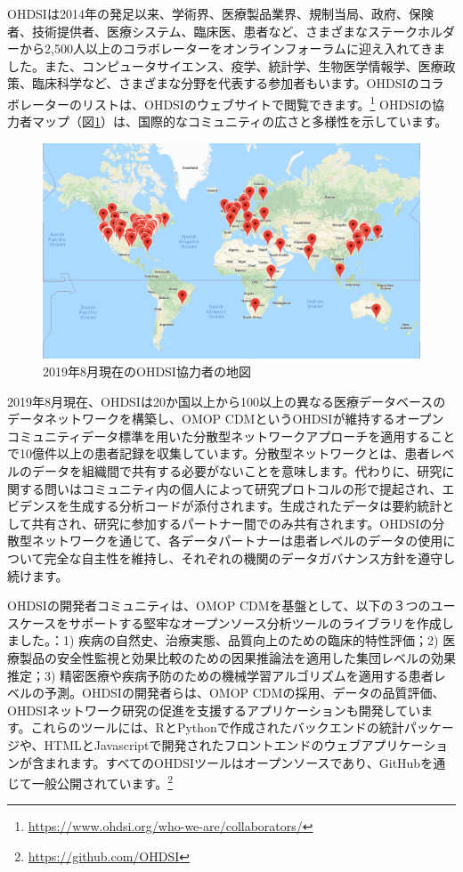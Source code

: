\documentclass[
  11pt]{book}
\theoremstyle{definition}
\theoremstyle{definition}
\theoremstyle{definition}
\theoremstyle{definition}
\theoremstyle{remark}
\begin{document}
OHDSIは2014年の発足以来、学術界、医療製品業界、規制当局、政府、保険者、技術提供者、医療システム、臨床医、患者など、さまざまなステークホルダーから2,500人以上のコラボレーターをオンラインフォーラムに迎え入れてきました。また、コンピュータサイエンス、疫学、統計学、生物医学情報学、医療政策、臨床科学など、さまざまな分野を代表する参加者もいます。OHDSIのコラボレーターのリストは、OHDSIのウェブサイトで閲覧できます。\footnote{\url{https://www.ohdsi.org/who-we-are/collaborators/}} OHDSIの協力者マップ（図\ref{fig:collaboratormap}）は、国際的なコミュニティの広さと多様性を示しています。

\begin{figure}

{\centering \includegraphics[width=1\linewidth]{images/OhdsiCommunity/mapOfCollaborators} 

}

\caption{2019年8月現在のOHDSI協力者の地図}\label{fig:collaboratormap}
\end{figure}

2019年8月現在、OHDSIは20か国以上から100以上の異なる医療データベースのデータネットワークを構築し、OMOP CDMというOHDSIが維持するオープンコミュニティデータ標準を用いた分散型ネットワークアプローチを適用することで10億件以上の患者記録を収集しています。分散型ネットワークとは、患者レベルのデータを組織間で共有する必要がないことを意味します。代わりに、研究に関する問いはコミュニティ内の個人によって研究プロトコルの形で提起され、エビデンスを生成する分析コードが添付されます。生成されたデータは要約統計として共有され、研究に参加するパートナー間でのみ共有されます。OHDSIの分散型ネットワークを通じて、各データパートナーは患者レベルのデータの使用について完全な自主性を維持し、それぞれの機関のデータガバナンス方針を遵守し続けます。

OHDSIの開発者コミュニティは、OMOP CDMを基盤として、以下の３つのユースケースをサポートする堅牢なオープンソース分析ツールのライブラリを作成しました。：1) 疾病の自然史、治療実態、品質向上のための臨床的特性評価；2) 医療製品の安全性監視と効果比較のための因果推論法を適用した集団レベルの効果推定；3) 精密医療や疾病予防のための機械学習アルゴリズムを適用する患者レベルの予測。OHDSIの開発者らは、OMOP CDMの採用、データの品質評価、OHDSIネットワーク研究の促進を支援するアプリケーションも開発しています。これらのツールには、RとPythonで作成されたバックエンドの統計パッケージや、HTMLとJavascriptで開発されたフロントエンドのウェブアプリケーションが含まれます。すべてのOHDSIツールはオープンソースであり、GitHubを通じて一般公開されています。\footnote{\url{https://github.com/OHDSI}}
\end{document}
